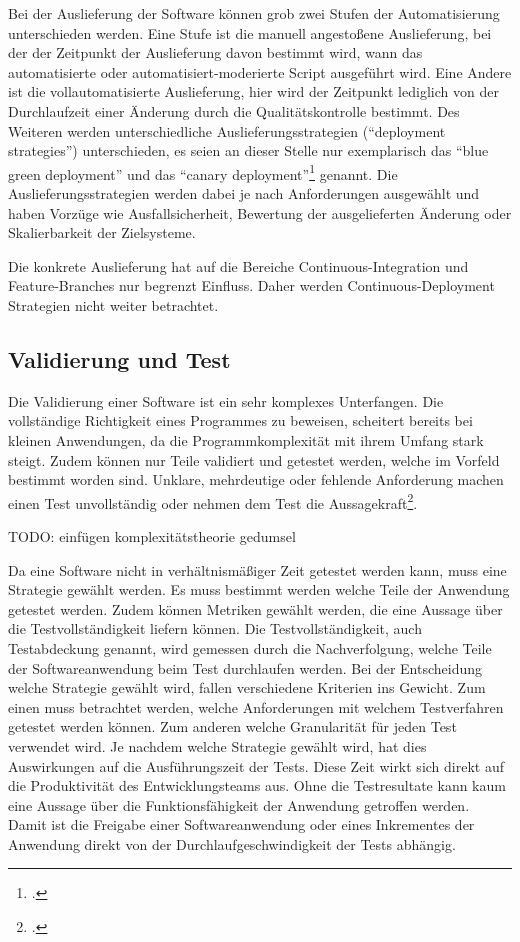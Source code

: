 Bei der Auslieferung der Software können grob zwei Stufen der Automatisierung unterschieden werden. Eine Stufe ist die 
manuell angestoßene Auslieferung, bei der der Zeitpunkt der Auslieferung davon bestimmt wird, wann das automatisierte 
oder automatisiert-moderierte Script ausgeführt wird. Eine Andere ist die vollautomatisierte Auslieferung, hier wird der 
Zeitpunkt lediglich von der Durchlaufzeit einer Änderung durch die Qualitätskontrolle bestimmt.
Des Weiteren werden unterschiedliche Auslieferungsstrategien (``deployment strategies'') unterschieden, es seien an 
dieser Stelle nur exemplarisch das ``blue green deployment'' und das ``canary deployment''\footcite[261-264 Deploying and Releasing Applications][]
{humble2010} genannt. Die Auslieferungsstrategien werden dabei je nach Anforderungen ausgewählt und haben Vorzüge wie 
Ausfallsicherheit, Bewertung der ausgelieferten Änderung oder Skalierbarkeit der Zielsysteme.

Die konkrete Auslieferung hat auf die Bereiche Continuous-Integration und Feature-Branches nur begrenzt Einfluss. Daher 
werden Continuous-Deployment Strategien nicht weiter betrachtet.

\subsection{Validierung und Test}

Die Validierung einer Software ist ein sehr komplexes Unterfangen. Die vollständige Richtigkeit eines Programmes 
zu beweisen, scheitert bereits bei kleinen Anwendungen, da die Programmkomplexität mit ihrem Umfang stark steigt. Zudem 
können nur Teile validiert und getestet werden, welche im Vorfeld bestimmt worden sind. Unklare, mehrdeutige oder 
fehlende Anforderung machen einen Test unvollständig oder nehmen dem Test die Aussagekraft\footcite[S. 243 Kapitel 4.6][]{software-quality2008}.

TODO: einfügen komplexitätstheorie gedumsel

Da eine Software nicht in verhältnismäßiger Zeit getestet werden kann, muss eine Strategie gewählt werden. Es muss 
bestimmt werden welche Teile der Anwendung getestet werden. Zudem können Metriken gewählt werden, die eine Aussage über 
die Testvollständigkeit liefern können. Die Testvollständigkeit, auch Testabdeckung genannt, wird gemessen durch die 
Nachverfolgung, welche Teile der Softwareanwendung beim Test durchlaufen werden. Bei der Entscheidung welche Strategie gewählt wird, fallen verschiedene Kriterien ins Gewicht. Zum einen muss betrachtet werden, welche Anforderungen mit welchem Testverfahren getestet werden können. Zum anderen welche Granularität für jeden Test verwendet wird.
Je nachdem welche Strategie gewählt wird, hat dies Auswirkungen auf die Ausführungszeit der Tests. Diese Zeit wirkt sich 
direkt auf die Produktivität des Entwicklungsteams aus. Ohne die Testresultate kann kaum eine Aussage über die 
Funktionsfähigkeit der Anwendung getroffen werden. Damit ist die Freigabe einer Softwareanwendung oder eines Inkrementes 
der Anwendung direkt von der Durchlaufgeschwindigkeit der Tests abhängig.

